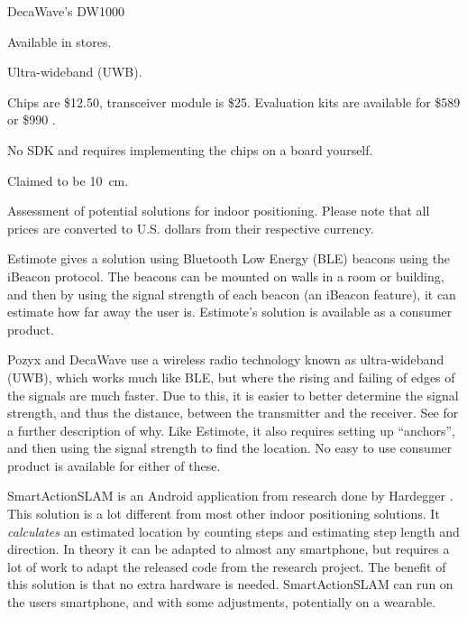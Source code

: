 \begin{table}[!htb]
\begin{description}[style=multiline,leftmargin=2.5cm]
        \item[Product:] DecaWave's DW1000 \cite{decawave}
        \item[Availability:] Available in stores. 
        \item[Technology:] Ultra-wideband (UWB).
        \item[Price:] Chips are \$12.50, transceiver module is \$25. Evaluation kits are available for \$589 or \$990 .
        \item[Ease of use:] No SDK and requires implementing the chips on a board yourself. 
        \item[Accuracy:] Claimed to be \SI{10}{\centi\meter}. 
        \end{description}
    \caption{Assessment of potential solutions for indoor positioning. Please note that all prices are converted to U.S. dollars from their respective currency.}
    \label{tbl:indoor-positioning}
\end{table}

Estimote gives a solution using Bluetooth Low Energy (BLE) beacons using the iBeacon protocol. 
The beacons can be mounted on walls in a room or building, 
and then by using the signal strength of each beacon (an iBeacon feature), 
it can estimate how far away the user is. 
Estimote's solution is available as a consumer product.

Pozyx and DecaWave use a wireless radio technology known as ultra-wideband (UWB), 
which works much like BLE, 
but where the rising and failing of edges of the signals are much faster. 
Due to this, it is easier to better determine the signal strength, and thus the distance, 
between the transmitter and the receiver. 
See \cite{UWB} for a further description of why. 
Like Estimote, it also requires setting up ``anchors'', 
and then using the signal strength to find the location. 
No easy to use consumer product is available for either of these.

SmartActionSLAM is an Android application from research done by Hardegger \etal \cite{SASLAM}. 
This solution is a lot different from most other indoor positioning solutions. 
It \emph{calculates} an estimated location by counting steps and estimating step length and direction. 
In theory it can be adapted to almost any smartphone, 
but requires a lot of work to adapt the released code from the research project. 
The benefit of this solution is that no extra hardware is needed. 
SmartActionSLAM can run on the users smartphone, 
and with some adjustments, potentially on a wearable.



